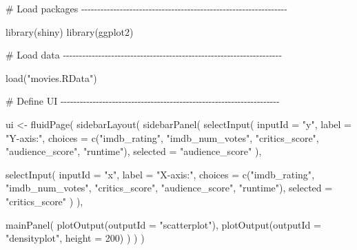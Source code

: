\documentclass[
  letterpaper,
  DIV=11,
  numbers=noendperiod]{scrreprt}
\newenvironment{Shaded}{\begin{snugshade}}{\end{snugshade}}
\newcommand{\AttributeTok}[1]{\textcolor[rgb]{0.40,0.46,0.14}{#1}}
\newcommand{\CommentTok}[1]{\textcolor[rgb]{0.37,0.37,0.37}{#1}}
\newcommand{\DecValTok}[1]{\textcolor[rgb]{0.68,0.00,0.00}{#1}}
\newcommand{\FunctionTok}[1]{\textcolor[rgb]{0.28,0.35,0.67}{#1}}
\newcommand{\NormalTok}[1]{\textcolor[rgb]{0.00,0.46,0.62}{#1}}
\newcommand{\OtherTok}[1]{\textcolor[rgb]{0.00,0.46,0.62}{#1}}
\newcommand{\StringTok}[1]{\textcolor[rgb]{0.13,0.47,0.30}{#1}}
\begin{document}
\begin{Shaded}
\begin{Highlighting}[]
\CommentTok{\# Load packages {-}{-}{-}{-}{-}{-}{-}{-}{-}{-}{-}{-}{-}{-}{-}{-}{-}{-}{-}{-}{-}{-}{-}{-}{-}{-}{-}{-}{-}{-}{-}{-}{-}{-}{-}{-}{-}{-}{-}{-}{-}{-}{-}{-}{-}{-}{-}{-}{-}{-}{-}{-}{-}{-}{-}{-}{-}{-}{-}{-}{-}{-}{-}{-}}

\FunctionTok{library}\NormalTok{(shiny)}
\FunctionTok{library}\NormalTok{(ggplot2)}

\CommentTok{\# Load data {-}{-}{-}{-}{-}{-}{-}{-}{-}{-}{-}{-}{-}{-}{-}{-}{-}{-}{-}{-}{-}{-}{-}{-}{-}{-}{-}{-}{-}{-}{-}{-}{-}{-}{-}{-}{-}{-}{-}{-}{-}{-}{-}{-}{-}{-}{-}{-}{-}{-}{-}{-}{-}{-}{-}{-}{-}{-}{-}{-}{-}{-}{-}{-}{-}{-}{-}{-}}

\FunctionTok{load}\NormalTok{(}\StringTok{"movies.RData"}\NormalTok{)}

\CommentTok{\# Define UI {-}{-}{-}{-}{-}{-}{-}{-}{-}{-}{-}{-}{-}{-}{-}{-}{-}{-}{-}{-}{-}{-}{-}{-}{-}{-}{-}{-}{-}{-}{-}{-}{-}{-}{-}{-}{-}{-}{-}{-}{-}{-}{-}{-}{-}{-}{-}{-}{-}{-}{-}{-}{-}{-}{-}{-}{-}{-}{-}{-}{-}{-}{-}{-}{-}{-}{-}{-}}

\NormalTok{ui }\OtherTok{\textless{}{-}} \FunctionTok{fluidPage}\NormalTok{(}
  \FunctionTok{sidebarLayout}\NormalTok{(}
    \FunctionTok{sidebarPanel}\NormalTok{(}
      \FunctionTok{selectInput}\NormalTok{(}
        \AttributeTok{inputId =} \StringTok{"y"}\NormalTok{,}
        \AttributeTok{label =} \StringTok{"Y{-}axis:"}\NormalTok{,}
        \AttributeTok{choices =} \FunctionTok{c}\NormalTok{(}\StringTok{"imdb\_rating"}\NormalTok{, }\StringTok{"imdb\_num\_votes"}\NormalTok{, }\StringTok{"critics\_score"}\NormalTok{, }\StringTok{"audience\_score"}\NormalTok{, }\StringTok{"runtime"}\NormalTok{),}
        \AttributeTok{selected =} \StringTok{"audience\_score"}
\NormalTok{      ),}

      \FunctionTok{selectInput}\NormalTok{(}
        \AttributeTok{inputId =} \StringTok{"x"}\NormalTok{,}
        \AttributeTok{label =} \StringTok{"X{-}axis:"}\NormalTok{,}
        \AttributeTok{choices =} \FunctionTok{c}\NormalTok{(}\StringTok{"imdb\_rating"}\NormalTok{, }\StringTok{"imdb\_num\_votes"}\NormalTok{, }\StringTok{"critics\_score"}\NormalTok{, }\StringTok{"audience\_score"}\NormalTok{, }\StringTok{"runtime"}\NormalTok{),}
        \AttributeTok{selected =} \StringTok{"critics\_score"}
\NormalTok{      )}
\NormalTok{    ),}

    \FunctionTok{mainPanel}\NormalTok{(}
      \FunctionTok{plotOutput}\NormalTok{(}\AttributeTok{outputId =} \StringTok{"scatterplot"}\NormalTok{),}
      \FunctionTok{plotOutput}\NormalTok{(}\AttributeTok{outputId =} \StringTok{"densityplot"}\NormalTok{, }\AttributeTok{height =} \DecValTok{200}\NormalTok{)}
\NormalTok{    )}
\NormalTok{  )}
\NormalTok{)}


\end{Highlighting}
\end{Shaded}
\end{document}
